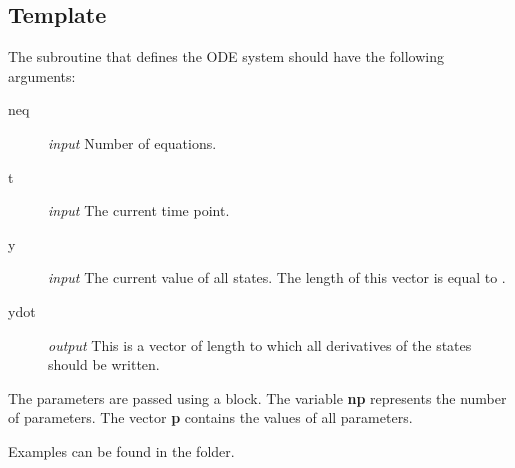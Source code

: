 \subsection{Template}
The \Fortran subroutine that defines the ODE system should have the following arguments:
\begin{description}
 \item[neq] \emph{input} Number of equations.
 \item[t] \emph{input} The current time point.
 \item[y] \emph{input} The current value of all states. The length of this vector is equal to .
 \item[ydot] \emph{output} This is a vector of length  to which all derivatives of the states should be written.
\end{description}
The parameters are passed using a  block. The variable \textbf{np} represents the number of parameters. The vector \textbf{p} contains the values of all parameters.



Examples can be found in the  folder.

